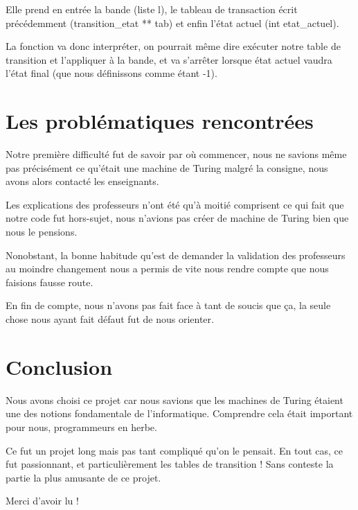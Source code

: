 \documentclass[a4paper,10pt, parskip=true]{scrartcl}
\begin{document}
        Elle prend en entrée la bande (liste l), le tableau de transaction écrit précédemment (transition\_etat ** tab) et enfin l'état actuel (int etat\_actuel).
        
        La fonction va donc interpréter, on pourrait même dire exécuter notre table de transition et l'appliquer à la bande, et va s'arrêter lorsque état actuel vaudra l'état final (que nous définissons comme étant -1).


\section{Les problématiques rencontrées}
    Notre première difficulté fut de savoir par où commencer, nous ne savions même pas précisément ce qu'était une machine de Turing malgré la consigne, nous avons alors contacté les enseignants.
    
    Les explications des professeurs n'ont été qu'à moitié comprisent ce qui fait que notre code fut hors-sujet, nous n'avions pas créer de machine de Turing bien que nous le pensions.
    
    Nonobstant, la bonne habitude qu'est de demander la validation des professeurs au moindre changement nous a permis de vite nous rendre compte que nous faisions fausse route.
    
    En fin de compte, nous n'avons pas fait face à tant de soucis que ça, la seule chose nous ayant fait défaut fut de nous orienter.
    
\section{Conclusion}
    Nous avons choisi ce projet car nous savions que les machines de Turing étaient une des notions fondamentale de l'informatique. Comprendre cela était important pour nous, programmeurs en herbe.
    
    Ce fut un projet long mais pas tant compliqué qu'on le pensait. En tout cas, ce fut passionnant, et particulièrement les tables de transition ! Sans conteste la partie la plus amusante de ce projet.
    
    Merci d'avoir lu !
    
    
\end{document}
